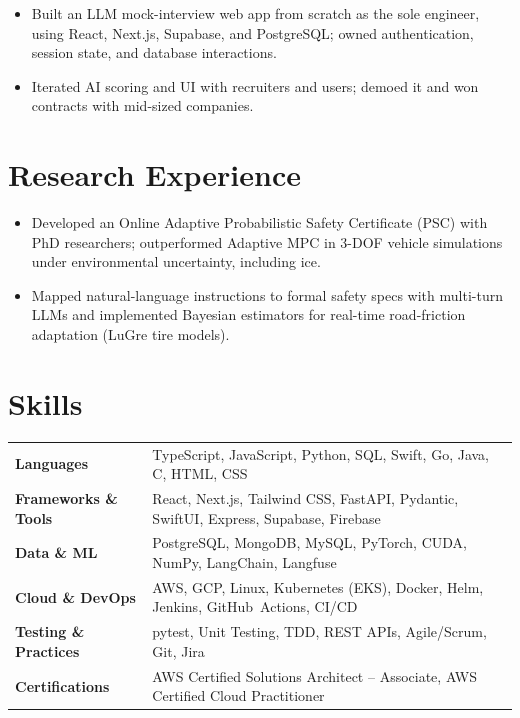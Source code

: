 \documentclass[11pt, letterpaper]{article}
\begin{document}
\vspace{1pt}
\begin{itemize}
  \item Built an LLM mock-interview web app from scratch as the sole engineer, using React, Next.js, Supabase, and PostgreSQL; owned authentication, session state, and database interactions.
  \item Iterated AI scoring and UI with recruiters and users; demoed it and won contracts with mid-sized companies.
\end{itemize}

\section{Research Experience}
\begin{itemize}
  \item Developed an Online Adaptive Probabilistic Safety Certificate (PSC) with PhD researchers; outperformed Adaptive MPC in 3-DOF vehicle simulations under environmental uncertainty, including ice.
  \item Mapped natural-language instructions to formal safety specs with multi-turn LLMs and implemented Bayesian estimators for real-time road-friction adaptation (LuGre tire models).
\end{itemize}

\section{Skills}
\begin{tabularx}{\textwidth}{@{}l @{\hspace{7pt}} >{\raggedright\arraybackslash}X@{}}
  \textbf{Languages} & TypeScript, JavaScript, Python, SQL, Swift, Go, Java, C, HTML, CSS \\[1pt]
  \textbf{Frameworks \& Tools} & React, Next.js, Tailwind CSS, FastAPI, Pydantic, SwiftUI, Express, Supabase, Firebase \\[1pt]
  \textbf{Data \& ML} & PostgreSQL, MongoDB, MySQL, PyTorch, CUDA, NumPy, LangChain, Langfuse \\[1pt]
  \textbf{Cloud \& DevOps} & AWS, GCP, Linux, Kubernetes (EKS), Docker, Helm, Jenkins, GitHub~Actions, CI/CD \\[1pt]
  \textbf{Testing \& Practices} & pytest, Unit Testing, TDD, REST APIs, Agile/Scrum, Git, Jira \\[1pt]
  \textbf{Certifications} & AWS Certified Solutions Architect -- Associate, AWS Certified Cloud Practitioner \\
\end{tabularx}
\end{document}
